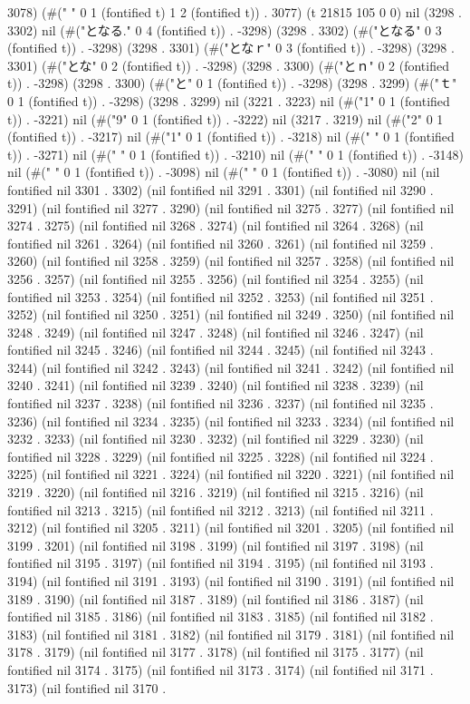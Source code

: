 3078) (#("  " 0 1 (fontified t) 1 2 (fontified t)) . 3077) (t 21815 105 0 0) nil (3298 . 3302) nil (#("となる." 0 4 (fontified t)) . -3298) (3298 . 3302) (#("となる" 0 3 (fontified t)) . -3298) (3298 . 3301) (#("となｒ" 0 3 (fontified t)) . -3298) (3298 . 3301) (#("とな" 0 2 (fontified t)) . -3298) (3298 . 3300) (#("とｎ" 0 2 (fontified t)) . -3298) (3298 . 3300) (#("と" 0 1 (fontified t)) . -3298) (3298 . 3299) (#("ｔ" 0 1 (fontified t)) . -3298) (3298 . 3299) nil (3221 . 3223) nil (#("1" 0 1 (fontified t)) . -3221) nil (#("9" 0 1 (fontified t)) . -3222) nil (3217 . 3219) nil (#("2" 0 1 (fontified t)) . -3217) nil (#("1" 0 1 (fontified t)) . -3218) nil (#(" " 0 1 (fontified t)) . -3271) nil (#(" " 0 1 (fontified t)) . -3210) nil (#(" " 0 1 (fontified t)) . -3148) nil (#(" " 0 1 (fontified t)) . -3098) nil (#(" " 0 1 (fontified t)) . -3080) nil (nil fontified nil 3301 . 3302) (nil fontified nil 3291 . 3301) (nil fontified nil 3290 . 3291) (nil fontified nil 3277 . 3290) (nil fontified nil 3275 . 3277) (nil fontified nil 3274 . 3275) (nil fontified nil 3268 . 3274) (nil fontified nil 3264 . 3268) (nil fontified nil 3261 . 3264) (nil fontified nil 3260 . 3261) (nil fontified nil 3259 . 3260) (nil fontified nil 3258 . 3259) (nil fontified nil 3257 . 3258) (nil fontified nil 3256 . 3257) (nil fontified nil 3255 . 3256) (nil fontified nil 3254 . 3255) (nil fontified nil 3253 . 3254) (nil fontified nil 3252 . 3253) (nil fontified nil 3251 . 3252) (nil fontified nil 3250 . 3251) (nil fontified nil 3249 . 3250) (nil fontified nil 3248 . 3249) (nil fontified nil 3247 . 3248) (nil fontified nil 3246 . 3247) (nil fontified nil 3245 . 3246) (nil fontified nil 3244 . 3245) (nil fontified nil 3243 . 3244) (nil fontified nil 3242 . 3243) (nil fontified nil 3241 . 3242) (nil fontified nil 3240 . 3241) (nil fontified nil 3239 . 3240) (nil fontified nil 3238 . 3239) (nil fontified nil 3237 . 3238) (nil fontified nil 3236 . 3237) (nil fontified nil 3235 . 3236) (nil fontified nil 3234 . 3235) (nil fontified nil 3233 . 3234) (nil fontified nil 3232 . 3233) (nil fontified nil 3230 . 3232) (nil fontified nil 3229 . 3230) (nil fontified nil 3228 . 3229) (nil fontified nil 3225 . 3228) (nil fontified nil 3224 . 3225) (nil fontified nil 3221 . 3224) (nil fontified nil 3220 . 3221) (nil fontified nil 3219 . 3220) (nil fontified nil 3216 . 3219) (nil fontified nil 3215 . 3216) (nil fontified nil 3213 . 3215) (nil fontified nil 3212 . 3213) (nil fontified nil 3211 . 3212) (nil fontified nil 3205 . 3211) (nil fontified nil 3201 . 3205) (nil fontified nil 3199 . 3201) (nil fontified nil 3198 . 3199) (nil fontified nil 3197 . 3198) (nil fontified nil 3195 . 3197) (nil fontified nil 3194 . 3195) (nil fontified nil 3193 . 3194) (nil fontified nil 3191 . 3193) (nil fontified nil 3190 . 3191) (nil fontified nil 3189 . 3190) (nil fontified nil 3187 . 3189) (nil fontified nil 3186 . 3187) (nil fontified nil 3185 . 3186) (nil fontified nil 3183 . 3185) (nil fontified nil 3182 . 3183) (nil fontified nil 3181 . 3182) (nil fontified nil 3179 . 3181) (nil fontified nil 3178 . 3179) (nil fontified nil 3177 . 3178) (nil fontified nil 3175 . 3177) (nil fontified nil 3174 . 3175) (nil fontified nil 3173 . 3174) (nil fontified nil 3171 . 3173) (nil fontified nil 3170 . 